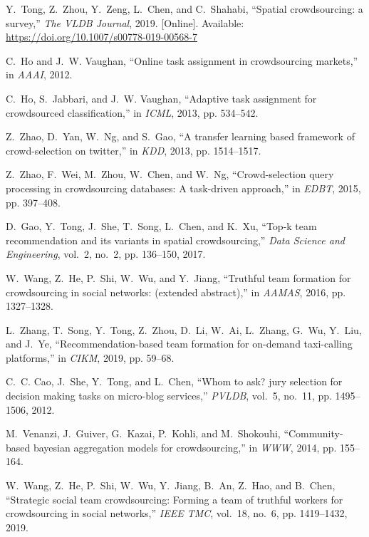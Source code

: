 \documentclass[11pt]{article}
\begin{document}
\begin{thebibliography}{10}
	\BIBentryALTinterwordspacing
	Y.~Tong, Z.~Zhou, Y.~Zeng, L.~Chen, and C.~Shahabi, ``Spatial crowdsourcing: a
	survey,'' \emph{The VLDB Journal}, 2019. [Online]. Available:
	\url{https://doi.org/10.1007/s00778-019-00568-7}
	\BIBentrySTDinterwordspacing
	
	C.~Ho and J.~W. Vaughan, ``Online task assignment in crowdsourcing markets,''
	in \emph{{AAAI}}, 2012.
	
	C.~Ho, S.~Jabbari, and J.~W. Vaughan, ``Adaptive task assignment for
	crowdsourced classification,'' in \emph{{ICML}}, 2013, pp. 534--542.
	
	Z.~Zhao, D.~Yan, W.~Ng, and S.~Gao, ``A transfer learning based framework of
	crowd-selection on twitter,'' in \emph{{KDD}}, 2013, pp. 1514--1517.
	
	Z.~Zhao, F.~Wei, M.~Zhou, W.~Chen, and W.~Ng, ``Crowd-selection query
	processing in crowdsourcing databases: {A} task-driven approach,'' in
	\emph{{EDBT}}, 2015, pp. 397--408.
	
	D.~Gao, Y.~Tong, J.~She, T.~Song, L.~Chen, and K.~Xu, ``Top-k team
	recommendation and its variants in spatial crowdsourcing,'' \emph{Data
		Science and Engineering}, vol.~2, no.~2, pp. 136--150, 2017.
	
	W.~Wang, Z.~He, P.~Shi, W.~Wu, and Y.~Jiang, ``Truthful team formation for
	crowdsourcing in social networks: (extended abstract),'' in \emph{AAMAS},
	2016, pp. 1327--1328.
	
	L.~Zhang, T.~Song, Y.~Tong, Z.~Zhou, D.~Li, W.~Ai, L.~Zhang, G.~Wu, Y.~Liu, and
	J.~Ye, ``Recommendation-based team formation for on-demand taxi-calling
	platforms,'' in \emph{CIKM}, 2019, pp. 59--68.
	
	C.~C. Cao, J.~She, Y.~Tong, and L.~Chen, ``Whom to ask? jury selection for
	decision making tasks on micro-blog services,'' \emph{PVLDB}, vol.~5, no.~11,
	pp. 1495--1506, 2012.
	
	M.~Venanzi, J.~Guiver, G.~Kazai, P.~Kohli, and M.~Shokouhi, ``Community-based
	bayesian aggregation models for crowdsourcing,'' in \emph{{WWW}}, 2014, pp.
	155--164.
	
	W.~Wang, Z.~He, P.~Shi, W.~Wu, Y.~Jiang, B.~An, Z.~Hao, and B.~Chen,
	``Strategic social team crowdsourcing: Forming a team of truthful workers for
	crowdsourcing in social networks,'' \emph{{IEEE} TMC}, vol.~18, no.~6, pp.
	1419--1432, 2019.
	

\end{thebibliography}
\end{document}
